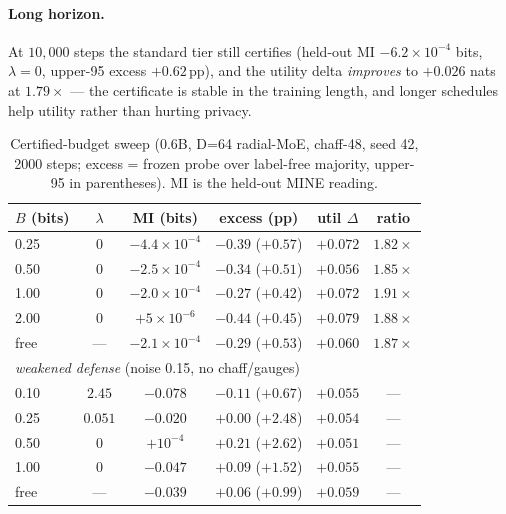\documentclass[10pt]{article}
\begin{document}
\paragraph{Long horizon.}
At $10{,}000$ steps the standard tier still certifies (held-out MI
$-6.2\!\times\!10^{-4}$ bits, $\lambda=0$, upper-95 excess $+0.62$\,pp),
and the utility delta \emph{improves} to $+0.026$ nats at $1.79\times$ —
the certificate is stable in the training length, and longer schedules
help utility rather than hurting privacy.

\begin{table}[t]
\centering\scriptsize
\setlength{\tabcolsep}{4pt}
\caption{Certified-budget sweep (0.6B, D=64 radial-MoE, chaff-48, seed 42,
2000 steps; excess = frozen probe over label-free majority, upper-95 in
parentheses).  MI is the held-out MINE reading.}
\label{tab:sweep}
\begin{tabular}{lccccc}
\toprule
$B$ (bits) & $\lambda$ & MI (bits) & excess (pp) & util $\Delta$ & ratio \\
\midrule
0.25 & 0 & $-4.4\!\times\!10^{-4}$ & $-0.39$ ($+0.57$) & $+0.072$ & $1.82\times$ \\
0.50 & 0 & $-2.5\!\times\!10^{-4}$ & $-0.34$ ($+0.51$) & $+0.056$ & $1.85\times$ \\
1.00 & 0 & $-2.0\!\times\!10^{-4}$ & $-0.27$ ($+0.42$) & $+0.072$ & $1.91\times$ \\
2.00 & 0 & $+5\!\times\!10^{-6}$  & $-0.44$ ($+0.45$) & $+0.079$ & $1.88\times$ \\
free & --- & $-2.1\!\times\!10^{-4}$ & $-0.29$ ($+0.53$) & $+0.060$ & $1.87\times$ \\
\midrule
\multicolumn{6}{l}{\emph{weakened defense} (noise 0.15, no chaff/gauges)} \\
0.10 & $2.45$ & $-0.078$ & $-0.11$ ($+0.67$) & $+0.055$ & --- \\
0.25 & $0.051$ & $-0.020$ & $+0.00$ ($+2.48$) & $+0.054$ & --- \\
0.50 & 0 & $+10^{-4}$ & $+0.21$ ($+2.62$) & $+0.051$ & --- \\
1.00 & 0 & $-0.047$ & $+0.09$ ($+1.52$) & $+0.055$ & --- \\
free & --- & $-0.039$ & $+0.06$ ($+0.99$) & $+0.059$ & --- \\
\bottomrule
\end{tabular}
\end{table}
\end{document}

